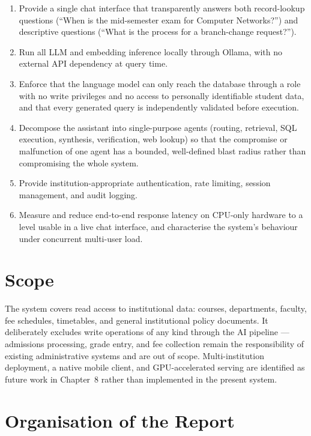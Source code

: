 \documentclass[11pt,a4paper,oneside]{report}
\begin{document}
\begin{enumerate}
\item Provide a single chat interface that transparently answers both
      record-lookup questions (``When is the mid-semester exam for Computer
      Networks?'') and descriptive questions (``What is the process for a
      branch-change request?'').
\item Run all LLM and embedding inference locally through Ollama, with no
      external API dependency at query time.
\item Enforce that the language model can only reach the database through a
      role with no write privileges and no access to personally identifiable
      student data, and that every generated query is independently validated
      before execution.
\item Decompose the assistant into single-purpose agents (routing,
      retrieval, SQL execution, synthesis, verification, web lookup) so that
      the compromise or malfunction of one agent has a bounded, well-defined
      blast radius rather than compromising the whole system.
\item Provide institution-appropriate authentication, rate limiting, session
      management, and audit logging.
\item Measure and reduce end-to-end response latency on CPU-only hardware to
      a level usable in a live chat interface, and characterise the system's
      behaviour under concurrent multi-user load.
\end{enumerate}

\section{Scope}

The system covers read access to institutional data: courses, departments,
faculty, fee schedules, timetables, and general institutional policy
documents. It deliberately excludes write operations of any kind through the
AI pipeline --- admissions processing, grade entry, and fee collection remain
the responsibility of existing administrative systems and are out of scope.
Multi-institution deployment, a native mobile client, and GPU-accelerated
serving are identified as future work in Chapter~8 rather than implemented in
the present system.

\section{Organisation of the Report}
\end{document}

